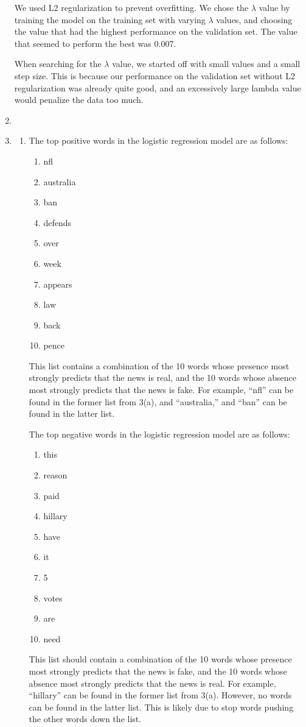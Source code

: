 \documentclass[10pt,letterpaper]{article}
\begin{document}
\begin{enumerate}
	We used L2 regularization to prevent overfitting.
	We chose the $\lambda$ value by training the model on the training set with varying $\lambda$ values, and choosing the value that had the highest performance on the validation set.
	The value that seemed to perform the best was 0.007.

	When searching for the $\lambda$ value, we started off with small values and a small step size.
	This is because our performance on the validation set without L2 regularization was already quite good, and an excessively large lambda value would penalize the data too much.

	\item %
	\item %
	\begin{enumerate}
		\item %
		The top positive words in the logistic regression model are as follows:
		\begin{enumerate}
			\item nfl
			\item australia
			\item ban
			\item defends
			\item over
			\item week
			\item appears
			\item law
			\item back
			\item pence
		\end{enumerate}
		This list contains a combination of the 10 words whose presence most strongly predicts that the news is real, and the 10 words whose absence most strongly predicts that the news is fake.
		For example, ``nfl'' can be found in the former list from 3(a), and ``australia,'' and ``ban'' can be found in the latter list.

		The top negative words in the logistic regression model are as follows:
		\begin{enumerate}
			\item this
			\item reason
			\item paid
			\item hillary
			\item have
			\item it
			\item 5
			\item votes
			\item are
			\item need
		\end{enumerate}
		This list should contain a combination of the 10 words whose presence most strongly predicts that the news is fake, and the 10 words whose absence most strongly predicts that the news is real.
		For example, ``hillary'' can be found in the former list from 3(a).
		However, no words can be found in the latter list.
		This is likely due to stop words pushing the other words down the list.


\end{enumerate}
\end{enumerate}
\end{document}

